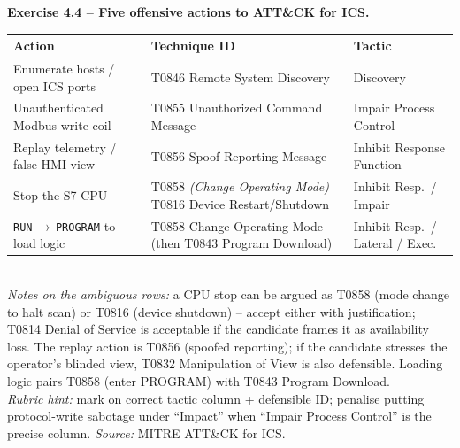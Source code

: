 \documentclass[11pt,a4paper]{article}
\begin{document}
\begin{solutionbox}
\textbf{Exercise 4.4 -- Five offensive actions to ATT\&CK for ICS.}\\[2pt]
\par\begin{tabular}{@{}p{6.4cm}p{3.6cm}p{3.8cm}@{}}
\toprule
\textbf{Action} & \textbf{Technique ID} & \textbf{Tactic} \\
\midrule
Enumerate hosts / open ICS ports & T0846 Remote System Discovery & Discovery \\
Unauthenticated Modbus write coil & T0855 Unauthorized Command Message & Impair Process Control \\
Replay telemetry / false HMI view & T0856 Spoof Reporting Message & Inhibit Response Function \\
Stop the S7 CPU & T0858 \emph{(Change Operating Mode)} \textbar{} T0816 Device Restart/Shutdown & Inhibit Resp.\ / Impair \\
\texttt{RUN}\,$\to$\,\texttt{PROGRAM} to load logic & T0858 Change Operating Mode (then T0843 Program Download) & Inhibit Resp.\ / Lateral / Exec. \\
\bottomrule
\end{tabular}\\[3pt]
\emph{Notes on the ambiguous rows:} a CPU stop can be argued as T0858 (mode change to halt scan) or
T0816 (device shutdown) -- accept either with justification; T0814 Denial of Service is acceptable
if the candidate frames it as availability loss. The replay action is T0856 (spoofed reporting); if
the candidate stresses the operator's blinded view, T0832 Manipulation of View is also defensible.
Loading logic pairs T0858 (enter PROGRAM) with T0843 Program Download.\\[2pt]
\emph{Rubric hint:} mark on correct tactic column + defensible ID; penalise putting protocol-write
sabotage under ``Impact'' when ``Impair Process Control'' is the precise column. \emph{Source:}
MITRE ATT\&CK for ICS.
\end{solutionbox}
\end{document}
